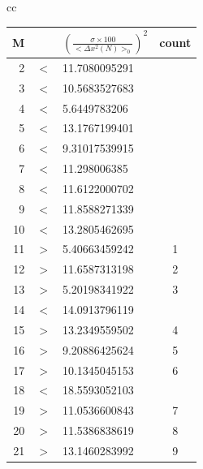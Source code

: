 \documentclass{jsarticle}
\begin{document}
\begin{enumerate}
\begin{enumerate}
\begin{table}[H]
\begin{center}
\begin{tabular}{cc}
                                \begin{minipage}{0.5\hsize}
                                    \begin{center}
                                    \begin{tabular}{rcl|c}
                                        M &     & $\left( \frac{\sigma\times 100}{< \Delta x^{2}(N)>_{0}}\right) ^{2}$ & count \\ \hline
                                        2 & $<$ & 11.7080095291 & \\
                                        3 & $<$ & 10.5683527683 & \\
                                        4 & $<$ & 5.6449783206 & \\
                                        5 & $<$ & 13.1767199401 & \\
                                        6 & $<$ & 9.31017539915 & \\
                                        7 & $<$ & 11.298006385 & \\
                                        8 & $<$ & 11.6122000702 & \\
                                        9 & $<$ & 11.8588271339 & \\
                                        10 & $<$ & 13.2805462695 & \\
                                        11 & $>$ & 5.40663459242 & 1 \\
                                        12 & $>$ & 11.6587313198 & 2 \\
                                        13 & $>$ & 5.20198341922 & 3 \\
                                        14 & $<$ & 14.0913796119 & \\
                                        15 & $>$ & 13.2349559502 & 4 \\
                                        16 & $>$ & 9.20886425624 & 5 \\
                                        17 & $>$ & 10.1345045153 & 6 \\
                                        18 & $<$ & 18.5593052103 & \\
                                        19 & $>$ & 11.0536600843 & 7 \\
                                        20 & $>$ & 11.5386838619 & 8 \\
                                        21 & $>$ & 13.1460283992 & 9 \\

\end{tabular}
\end{center}
\end{minipage}
\end{tabular}
\end{center}
\end{table}
\end{enumerate}
\end{enumerate}
\end{document}
